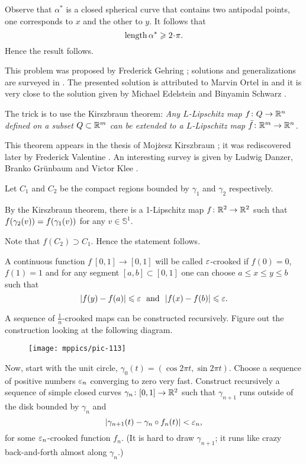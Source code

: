 Observe that $\alpha^{*}$ is a closed spherical curve that contains two antipodal points,
one corresponds to $x$ and the other to $y$.
It follows that
$$\length \alpha^{*}\ge 2\cdot\pi.$$
Hence the result follows.\qeds



This problem was proposed by Frederick Gehring \cite[see 7.22 in][]{gehring};
solutions and generalizations are surveyed in \cite{mateljevic}. 
The presented solution is attributed to Marvin Ortel in \cite{CJKSW} and it is very close to the solution given by Michael Edelstein and Binyamin Schwarz \cite{edelstein-schwatz}.

 The trick is to use the Kirszbraun theorem:
\emph{Any $L$-Lipschitz  map $f\colon Q\to \mathbb{R}^n$ defined on a subset $Q\subset \mathbb{R}^m$ can be extended to a $L$-Lipschitz  map $\bar f\colon\mathbb{R}^m\to \mathbb{R}^n$.}

This theorem  appears in the thesis of Mojżesz Kirszbraun \cite[][]{kirszbraun};
it was rediscovered later by Frederick Valentine \cite[][]{valentine}.
An interesting survey is given by 
Ludwig Danzer, Branko Gr{\"u}nbaum and Victor Klee \cite[][]{danzer-grunbaum-klee}.

\medskip

Let $C_1$ and $C_2$ be the compact regions bounded by $\gamma_1$ and $\gamma_2$ respectively.

By the Kirszbraun theorem, there is a 1-Lipschitz map $f\colon\mathbb{R}^2\to\mathbb{R}^2$ 
such that $f(\gamma_2(v))\z=f(\gamma_1(v))$ for any $v\in\mathbb S^1$.

Note that $f(C_2)\supset C_1$.
Hence the statement follows.\qeds

A continuous function $f\:[0,1]\to [0,1]$
will be called $\varepsilon$-crooked 
if $f(0)=0$, $f(1)=1$ 
and for any segment $[a,b]\subset [0,1]$ 
one can choose $a\le x\le y\le b$ 
such that
\[|f(y)-f(a)|\le\eps\ \ \text{and}\ \ |f(x)-f(b)|\le\eps.\]

A sequence of $\tfrac1n$-crooked maps can be constructed recursively. 
Figure out the construction looking at the following diagram.

\begin{figure}[ht!]
\centering
\texttt{[image: mppics/pic-113]}
\end{figure}

Now, start with the unit circle, 
$\gamma_0(t)=(\cos 2\pi t,\sin 2 \pi t)$.
Choose a sequence of positive numbers $\varepsilon_n$ converging to zero very fast. 
Construct recursively a sequence of simple closed curves $\gamma_n\:[0,1]\z\to\RR^2$ such that $\gamma_{n+1}$ runs outside of the disk bounded by $\gamma_n$
and 
\[|\gamma_{n+1}(t)-\gamma_n\circ f_n(t)|<\varepsilon_n,\]
for some $\varepsilon_n$-crooked function $f_n$.
(It is hard to draw $\gamma_{n+1}$; it runs like crazy back-and-forth almost along $\gamma_n$.)

